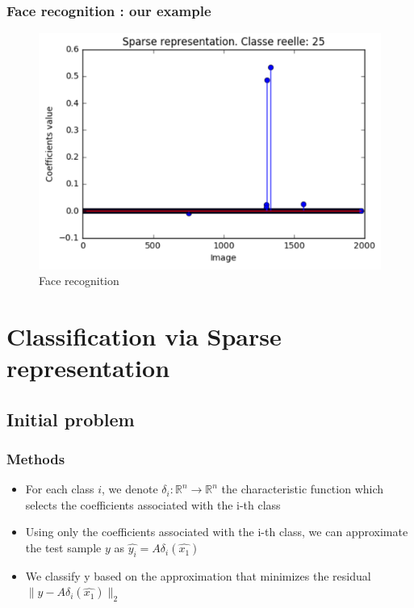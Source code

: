 \documentclass{beamer}
\begin{document}

\begin{frame}
\frametitle{Face recognition : our example}

			\begin{figure}[!ht]
			\begin{center}
			\includegraphics[scale=0.5]{sparsity.png}
			\end{center}
			\caption{Face recognition}
			\label{fa}
			\end{figure}
\end{frame}

\section{Classification via Sparse representation}

\subsection{Initial problem}

\begin{frame}

\frametitle{Methods}


	\begin{itemize}
	
\item For each class $i$, we denote $\delta_{i} : \mathbb{R}^{n} \to \mathbb{R}^{n}$ the characteristic function which selects the coefficients associated with the i-th class

\item Using only the coefficients associated with the i-th class, we can approximate the test sample $y$ as $\hat{y_{i}}=A\delta_{i}(\hat{x_{1}})$
\item We classify y based on the approximation that minimizes the residual $\|y-A\delta_{i}(\hat{x_{1}})\|_{2}$

	\end{itemize}

\end{frame}
\end{document}
